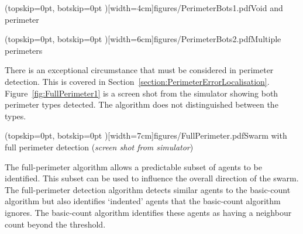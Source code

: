 \documentclass{ieeeaccess}
\begin{document}
\Figure[t!](topskip=0pt, botskip=0pt )[width=4cm]{figures/PerimeterBots1.pdf}{Void and perimeter\label{concave:VoidPerimeter1}}


\Figure[t!](topskip=0pt, botskip=0pt )[width=6cm]{figures/PerimeterBots2.pdf}{Multiple perimeters\label{concave:VoidPerimeter2}}



There is an exceptional circumstance that must be considered in perimeter detection. This is covered in Section~\ref{section:PerimeterErrorLocalisation}. Figure~\ref{fig:FullPerimeter1} is a screen shot from the simulator showing both perimeter types detected. The algorithm does not distinguished between the types. 


\Figure[t!](topskip=0pt, botskip=0pt )[width=7cm]{figures/FullPerimeter.pdf}{Swarm with full perimeter detection (\textit{screen shot from simulator})\label{fig:FullPerimeter1}}

The full-perimeter algorithm allows a predictable subset of agents to be identified. This subset can be used to influence the overall direction of the swarm. The full-perimeter detection algorithm detects similar agents to the basic-count algorithm but also identifies `indented' agents that the basic-count algorithm ignores. The basic-count algorithm identifies these agents as having a neighbour count beyond the threshold.
\end{document}
